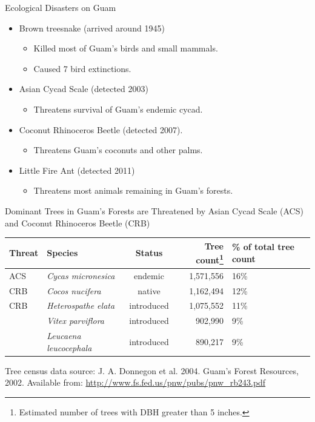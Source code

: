 \documentclass[]{beamer}
\begin{document}
\begin{frame}{Ecological Disasters on Guam}
	\begin{itemize}
		\item Brown treesnake (arrived around 1945)
		\begin{itemize}
			\item Killed most of Guam's birds and small mammals. 
			\item Caused 7 bird extinctions.
		\end{itemize}
		\item Asian Cycad Scale (detected 2003)
		\begin{itemize}
			\item Threatens survival of Guam's endemic cycad.
		\end{itemize}
		\item Coconut Rhinoceros Beetle (detected 2007). 
		\begin{itemize}
			\item Threatens Guam's coconuts and other palms.
		\end{itemize}
		\item Little Fire Ant (detected 2011)
		\begin{itemize}
			\item Threatens most animals remaining in Guam's forests.
		\end{itemize}
	\end{itemize}		
\end{frame}

\begin{frame}{Dominant Trees in Guam's Forests are Threatened by Asian Cycad Scale (ACS) and Coconut Rhinoceros Beetle (CRB)}
	\begin{center}
		\begin{tabular}{llcrp{0.35in}}
			\hline
			\textbf{Threat} & \textbf{Species} & \textbf{Status} & \textbf{Tree count\footnote{Estimated number of trees with DBH greater than 5 inches.}} & \textbf{\% of total tree count}\\
			\hline
			\rowcolor{yellow}
			ACS & \textit{Cycas micronesica} & endemic & 1,571,556 & 16\% \\ 
			\rowcolor{yellow}
			CRB & \textit{Cocos nucifera} & native & 1,162,494 & 12\% \\ 
			\rowcolor{yellow}
			CRB & \textit{Heterospathe elata} & introduced & 1,075,552 & 11\% \\ 
			
			\hline
			& \textit{Vitex parviflora} & introduced & 902,990 & 9\% \\ 
			& \textit{Leucaena leucocephala} & introduced & 890,217 & 9\%\\
			\hline
		\end{tabular} 
	\end{center}
	Tree census data source: J. A. Donnegon et al. 2004. Guam’s Forest Resources, 2002. Available from: \url{http://www.fs.fed.us/pnw/pubs/pnw_rb243.pdf}
	
\end{frame}
\end{document}
